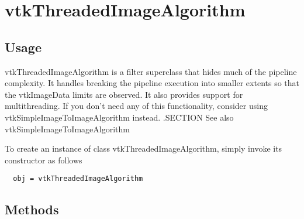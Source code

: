 \section{vtkThreadedImageAlgorithm}

\subsection{Usage}

 vtkThreadedImageAlgorithm is a filter superclass that hides much of the 
 pipeline  complexity. It handles breaking the pipeline execution 
 into smaller extents so that the vtkImageData limits are observed. It 
 also provides support for multithreading. If you don't need any of this
 functionality, consider using vtkSimpleImageToImageAlgorithm instead.
 .SECTION See also
 vtkSimpleImageToImageAlgorithm

To create an instance of class vtkThreadedImageAlgorithm, simply
invoke its constructor as follows
\begin{verbatim}
  obj = vtkThreadedImageAlgorithm
\end{verbatim}
\subsection{Methods}

